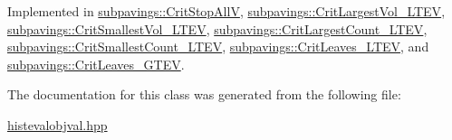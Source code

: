 \-Implemented in \hyperlink{classsubpavings_1_1CritStopAllV_ab18d1db7cca80d5700780bece7719c57}{subpavings\-::\-Crit\-Stop\-All\-V}, \hyperlink{classsubpavings_1_1CritLargestVol__LTEV_af596395bc98265787a542d4a4c3862e0}{subpavings\-::\-Crit\-Largest\-Vol\-\_\-\-L\-T\-E\-V}, \hyperlink{classsubpavings_1_1CritSmallestVol__LTEV_a333d65dbd5d82b81df266cb1d2372acd}{subpavings\-::\-Crit\-Smallest\-Vol\-\_\-\-L\-T\-E\-V}, \hyperlink{classsubpavings_1_1CritLargestCount__LTEV_a91c526ecfba7c9463ac6a45df852f8dd}{subpavings\-::\-Crit\-Largest\-Count\-\_\-\-L\-T\-E\-V}, \hyperlink{classsubpavings_1_1CritSmallestCount__LTEV_a7ed9d4d8c01c6de7f57113fbc6483401}{subpavings\-::\-Crit\-Smallest\-Count\-\_\-\-L\-T\-E\-V}, \hyperlink{classsubpavings_1_1CritLeaves__LTEV_af02abe8af576a43ccd40e44cc55fcf1e}{subpavings\-::\-Crit\-Leaves\-\_\-\-L\-T\-E\-V}, and \hyperlink{classsubpavings_1_1CritLeaves__GTEV_a89c436b8604c88d2b49e97b6015039bf}{subpavings\-::\-Crit\-Leaves\-\_\-\-G\-T\-E\-V}.



\-The documentation for this class was generated from the following file\-:\begin{DoxyCompactItemize}
\item 
\hyperlink{histevalobjval_8hpp}{histevalobjval.\-hpp}\end{DoxyCompactItemize}
